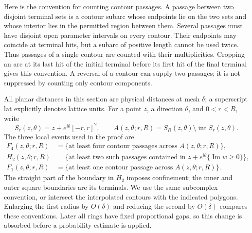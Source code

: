 Here is the convention for counting contour passages.  A passage between
two disjoint terminal sets is a contour subarc whose endpoints lie on the
two sets and whose interior lies in the permitted region between them.
Several passages must have disjoint open parameter intervals on every
contour.  Their endpoints may coincide at terminal hits, but a subarc of
positive length cannot be used twice.  Thus passages of a single contour
are counted with their multiplicities.  Cropping an arc at its last hit
of the initial terminal before its first hit of the final terminal gives
this convention.  A reversal of a contour can supply two passages; it is
not suppressed by counting only contour components.

All planar distances in this section are physical distances at mesh
$\delta$; a superscript $\mathrm{lat}$ explicitly denotes lattice units.
For a point $z$, a direction $\theta$, and $0<r<R$, write
\[
 S_r(z,\theta)=z+e^{i\theta}[-r,r]^2,
 \qquad
 A(z,\theta;r,R)=S_R(z,\theta)\setminus\operatorname{int}S_r(z,\theta).
\]
The three local events used in the proof are
\begin{align}
 F_4(z,\theta;r,R)&=\{\text{at least four contour passages across }A(z,\theta;r,R)\},\nonumber\\
 H_2(z,\theta;r,R)&=\{\text{at least two such passages contained in }
 z+e^{i\theta}\{\operatorname{Im}w\geq0\}\},\label{eq:stability-checks}\\
 F_1(z,\theta;r,R)&=\{\text{at least one contour passage across }A(z,\theta;r,R)\}.
 \nonumber
\end{align}
The straight part of the boundary in $H_2$ imposes confinement; the inner
and outer square boundaries are its terminals.  We use the same
subcomplex convention, or intersect the interpolated contours with the
indicated polygons.  Enlarging the first radius by $O(\delta)$ and reducing
the second by $O(\delta)$ compares these conventions.  Later all rings have
fixed proportional gaps, so this change is absorbed before a probability
estimate is applied.

